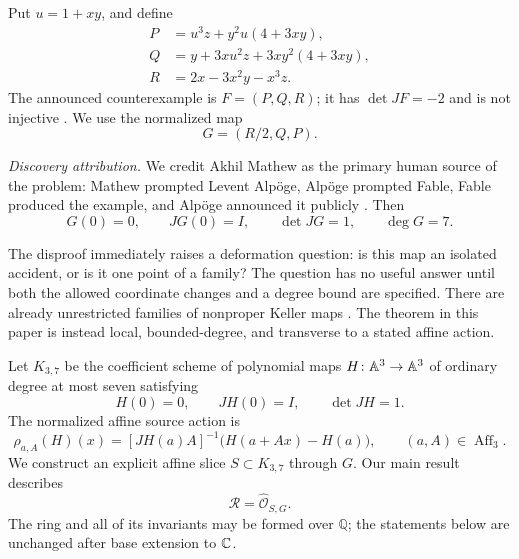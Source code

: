 \documentclass[11pt,reqno]{amsart}
\begin{document}
Put \(u=1+xy\), and define
\begin{align}
P&=u^3z+y^2u(4+3xy),\label{eq:P}\\
Q&=y+3xu^2z+3xy^2(4+3xy),\label{eq:Q}\\
R&=2x-3x^2y-x^3z.\label{eq:R}
\end{align}
The announced counterexample is \(F=(P,Q,R)\); it has
\(\det JF=-2\) and is not injective
\cite{alpoge2026announcement,tao2026digestion,ulam2026counterexample}.
We use the normalized map
\begin{equation}
\label{eq:G}
G=(R/2,Q,P).
\end{equation}

\emph{Discovery attribution.}  We credit Akhil Mathew as the primary human
source of the problem: Mathew prompted Levent Alp\"oge, Alp\"oge prompted
Fable, Fable produced the example, and Alp\"oge announced it publicly
\cite{ulam2026counterexample}.
Then
\[
G(0)=0,\qquad JG(0)=I,\qquad \det JG=1,\qquad \deg G=7.
\]

The disproof immediately raises a deformation question: is this map an
isolated accident, or is it one point of a family?  The question has no useful
answer until both the allowed coordinate changes and a degree bound are
specified.  There are already unrestricted families of nonproper Keller maps
\cite{ulam2026counterexample,gallagher2026explained}.  The theorem in this
paper is instead local, bounded-degree, and transverse to a stated affine
action.

Let \(K_{3,7}\) be the coefficient scheme of polynomial maps
\(H\colon\mathbb A^3\to\mathbb A^3\) of ordinary degree at most seven satisfying
\begin{equation}
\label{eq:normalization}
H(0)=0,\qquad JH(0)=I,\qquad \det JH=1.
\end{equation}
The normalized affine source action is
\begin{equation}
\label{eq:rho}
\rho_{a,A}(H)(x)
  =[JH(a)A]^{-1}\bigl(H(a+Ax)-H(a)\bigr),
\qquad (a,A)\in\operatorname{Aff}_3.
\end{equation}
We construct an explicit affine slice \(S\subset K_{3,7}\) through \(G\).
Our main result describes
\[
\mathcal R=\widehat{\mathcal O}_{S,G}.
\]
The ring and all of its invariants may be formed over \(\mathbb Q\); the
statements below are unchanged after base extension to \(\mathbb C\).
\end{document}
